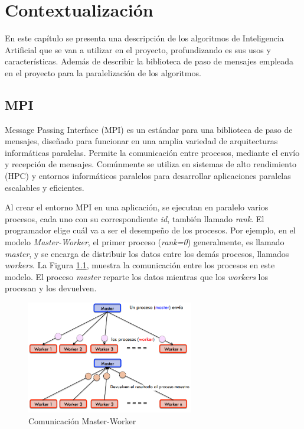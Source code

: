 \chapter{Contextualización}
\label{cap:c2_context}



	En este capítulo se presenta una descripción de los algoritmos de Inteligencia Artificial que se van a utilizar en el proyecto, profundizando es sus usos y características. Además de describir la biblioteca de paso de mensajes empleada en el proyecto para la paralelización de los algoritmos.
	

\section{MPI}

	Message Passing Interface\cite{barker2015message}  (MPI) es un estándar para una biblioteca de paso de mensajes, diseñado para funcionar en una amplia variedad de arquitecturas informáticas paralelas. Permite la comunicación entre procesos, mediante el envío y recepción de mensajes. Comúnmente se utiliza en sistemas de alto rendimiento\cite{stone1990high} (HPC) y entornos informáticos paralelos para desarrollar aplicaciones paralelas escalables y eficientes.
	
	
	Al crear el entorno MPI en una aplicación, se ejecutan en paralelo varios procesos, cada uno con su correspondiente \textit{id}, también llamado \textit{rank}. El programador elige cuál va a ser el desempeño de los procesos. Por ejemplo, en el modelo \textit{Master-Worker}, el primer proceso (\textit{rank=0}) generalmente, es llamado \textit{master}, y se encarga de distribuir los datos entre los demás procesos, llamados \textit{workers}. La Figura \ref{fig:comunicacion_mw}, muestra la comunicación entre los procesos en este modelo. El proceso \textit{master} reparte los datos mientras que los \textit{workers} los procesan y los devuelven.


	\begin{figure}[!h]
		\centering
		\includegraphics[width=0.65\textwidth]{images/chapter_2/mpi_1}
		\caption{Comunicación Master-Worker}
		\label{fig:comunicacion_mw}
	\end{figure}

